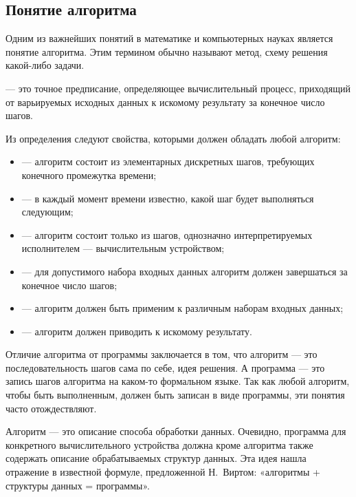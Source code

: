 \subsection{Понятие алгоритма}

Одним из важнейших понятий в математике и компьютерных науках является
понятие алгоритма. Этим термином обычно называют метод, схему решения
какой-либо задачи.

\begin{defn}
   — это точное предписание, определяющее
  вычислительный процесс, приходящий от варьируемых исходных данных к
  искомому результату за конечное число шагов.
\end{defn}

Из определения следуют свойства, которыми должен обладать любой
алгоритм:

\begin{itemize}
\item {} — алгоритм состоит из
  элементарных дискретных шагов, требующих конечного промежутка
  времени;
\item {} — в каждый
  момент времени известно, какой шаг будет выполняться следующим;
\item {} — алгоритм состоит только из
  шагов, однозначно интерпретируемых исполнителем — вычислительным
  устройством;
\item {} — для допустимого набора входных
  данных алгоритм должен завершаться за конечное число шагов;
\item {} — алгоритм должен быть
  применим к различным наборам входных данных;
\item {} — алгоритм должен
  приводить к искомому результату.
\end{itemize}

Отличие алгоритма от программы заключается в том, что алгоритм — это
последовательность шагов сама по себе, идея решения. А программа — это
запись шагов алгоритма на каком-то формальном языке. Так как любой
алгоритм, чтобы быть выполненным, должен быть записан в виде
программы, эти понятия часто отождествляют.

Алгоритм — это описание способа обработки данных. Очевидно, программа
для конкретного вычислительного устройства должна кроме алгоритма
также содержать описание обрабатываемых структур данных. Эта идея
нашла отражение в известной формуле, предложенной Н.~Виртом:
«алгоритмы + структуры данных = программы».

